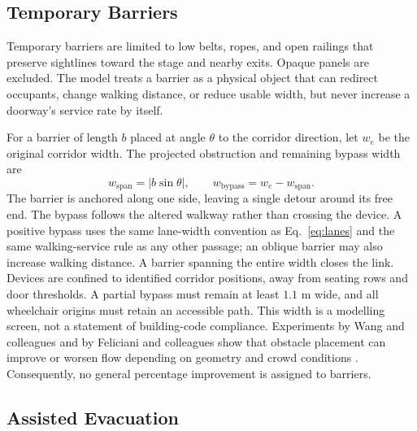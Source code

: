 \documentclass[11pt,a4paper]{article}
\begin{document}
\subsection{Temporary Barriers}

Temporary barriers are limited to low belts, ropes, and open railings that preserve sightlines toward the stage and nearby exits. Opaque panels are excluded. The model treats a barrier as a physical object that can redirect occupants, change walking distance, or reduce usable width, but never increase a doorway's service rate by itself.

For a barrier of length $b$ placed at angle $\theta$ to the corridor direction, let $w_e$ be the original corridor width. The projected obstruction and remaining bypass width are
\begin{equation}\label{eq:barrier}
w_{\mathrm{span}}=|b\sin\theta|,\qquad
w_{\mathrm{bypass}}=w_e-w_{\mathrm{span}}.
\end{equation}
The barrier is anchored along one side, leaving a single detour around its free end. The bypass follows the altered walkway rather than crossing the device. A positive bypass uses the same lane-width convention as Eq.~\eqref{eq:lanes} and the same walking-service rule as any other passage; an oblique barrier may also increase walking distance.
A barrier spanning the entire width closes the link. Devices are confined to identified corridor positions, away from seating rows and door thresholds. A partial bypass must remain at least $1.1$ m wide, and all wheelchair origins must retain an accessible path. This width is a modelling screen, not a statement of building-code compliance. Experiments by Wang and colleagues and by Feliciani and colleagues show that obstacle placement can improve or worsen flow depending on geometry and crowd conditions \cite{wang,feliciani,chen}. Consequently, no general percentage improvement is assigned to barriers.

\subsection{Assisted Evacuation}
\end{document}
